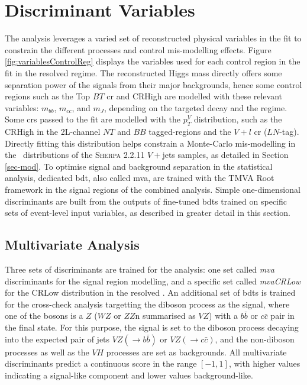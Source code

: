 \section{Discriminant Variables}\label{sec-vh-disc}
The analysis leverages a varied set of reconstructed physical variables in the fit to constrain the different processes and control mis-modelling effects. Figure \ref{fig:variablesControlReg} displays the variables used for each control region in the fit in the resolved regime. The reconstructed Higgs mass directly offers some separation power of the signals from their major backgrounds, hence some control regions such as the Top $BT$ \gls{cr} and CRHigh are modelled with these relevant variables: $m_{bb}$, $m_{cc}$, and $m_J$, depending on the targeted decay and the regime. Some \gls{cr}s passed to the fit are modelled with the $p_T^V$ distribution, such as the CRHigh in the 2L-channel $NT$ and $BB$ tagged-regions and the $V+l$ \gls{cr} ($LN$-tag). Directly fitting this distribution helps constrain a Monte-Carlo mis-modelling in the \ptv\ distributions of the \textsc{Sherpa} 2.2.11 $V+$jets samples, as detailed in Section \ref{sec-mod}. To optimise signal and background separation in the statistical analysis, dedicated \gls{bdt}, also called \gls{mva}, are trained with the \textsc{TMVA} Root framework \cite{Therhaag:2011jh} in the signal regions of the combined analysis. Simple one-dimensional discriminants are built from the outputs of fine-tuned \gls{bdt}s trained on specific sets of event-level input variables, as described in greater detail in this section. \\

\subsection{Multivariate Analysis}
Three sets of discriminants are trained for the analysis: one set called \textit{\gls{mva}} discriminants for the signal region modelling, and a specific set called \textit{mvaCRLow} for the CRLow distribution in the resolved \vhb. An additional set of \gls{bdt}s is trained for the cross-check analysis targetting the diboson process as the signal, where one of the bosons is a $Z$ ($WZ$ or $ZZ$n summarised as $VZ$) with a $b\bar{b}$ or $c\bar{c}$ pair in the final state. For this purpose, the signal is set to the diboson process decaying into the expected pair of jets $VZ(\rightarrow b\bar{b})$ or $VZ(\rightarrow c\bar{c})$, and the non-diboson processes as well as the $VH$ processes are set as backgrounds. All multivariate discriminants predict a continuous score in the range $[-1, 1]$, with higher values indicating a signal-like component and lower values background-like.

